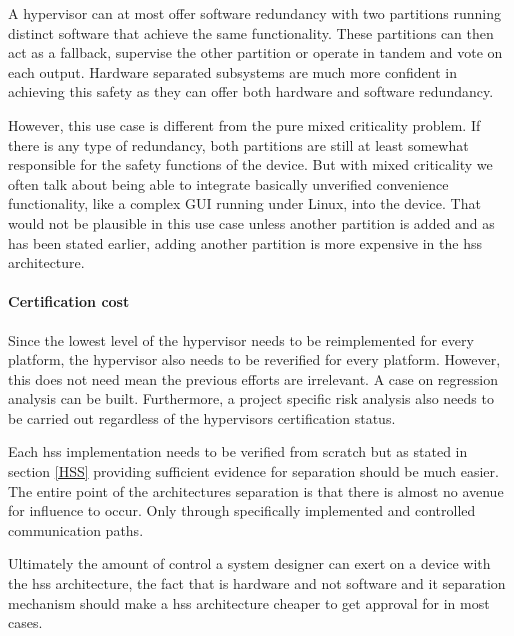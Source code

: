  A hypervisor can at most offer software redundancy with two partitions running distinct software that achieve the same functionality. These partitions can then act as a fallback, supervise the other partition or operate in tandem and vote on each output. Hardware separated subsystems are much more confident in achieving this safety as they can offer both hardware and software redundancy. 
 
However, this use case is different from the pure mixed criticality problem. If there is any type of redundancy, both partitions are still at least somewhat responsible for the safety functions of the device. But with mixed criticality we often talk about being able to integrate basically unverified convenience functionality, like a complex GUI running under Linux, into the device. That would not be plausible in this use case unless another partition is added and as has been stated earlier, adding another partition is more expensive in the \acrshort{hss} architecture.

\paragraph{Certification cost}

Since the lowest level of the hypervisor needs to be reimplemented for every platform, the hypervisor also needs to be reverified for every platform. However, this does not need mean the previous efforts are irrelevant. A case on regression analysis can be built.
Furthermore, a project specific risk analysis also needs to be carried out regardless of the hypervisors certification status.

Each \acrshort{hss} implementation needs to be verified from scratch but as stated in section \ref{HSS} providing sufficient evidence for separation should be much easier. The entire point of the architectures separation is that there is almost no avenue for influence to occur. Only through specifically implemented and controlled communication paths.

Ultimately the amount of control a system designer can exert on a device with the \acrshort{hss} architecture, the fact that is hardware and not software and it separation mechanism should make a \acrshort{hss} architecture cheaper to get approval for in most cases.

